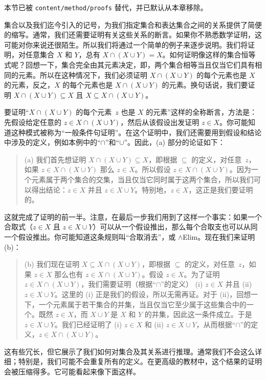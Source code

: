 \documentclass[../../../include/open-logic-section]{subfiles}
\begin{document}

\begin{editorial}
本节已被 \verb|content/method/proofs| 替代，并已默认从本章移除。
\end{editorial}

\begin{explain}
集合以及我们迄今引入的记号，为我们指定集合和表达集合之间的关系提供了简便的缩写。通常，我们还需要证明有关这些关系的断言。如果你不熟悉数学证明，这可能对你来说还很陌生。所以我们将通过一个简单的例子来逐步说明。我们将证明，对任意集合 $X$ 和 $Y$，总有 $X \cap (X \cup Y) = X$。如何证明像这样的集合恒等式呢？回想一下，集合完全由其元素决定，即，两个集合相等当且仅当它们具有相同的元素。所以在这种情况下，我们必须证明 $X \cap (X \cup Y)$ 的每个元素也是 $X$ 的元素，反之，$X$ 的每个元素也是 $X \cap (X \cup Y)$ 的元素。换句话说，我们要证明 $X \cap (X \cup Y) \subseteq X$ 且 $X \subseteq X \cap (X \cup Y)$。

要证明“$X \cap (X \cup Y)$ 的每个元素~$z$ 也是 $X$ 的元素”这样的全称断言，方法是：先假设给定任意的 $z \in X \cap (X \cup Y)$，然后从该假设出发证明 $z \in X$。你可能知道这种模式被称为“一般条件句证明”。在这个证明中，我们还需要用到假设和结论中涉及的定义，例如本例中的“$\cap$”和“$\cup$”。因此，(a) 部分的论证如下：

\begin{quote}
(a) 我们首先想证明 $X \cap (X \cup Y) \subseteq X$，即根据 $\subseteq$ 的定义，对任意~$z$，如果 $z \in X \cap (X \cup Y)$ 那么 $z \in X$。所以假设 $z \in X \cap (X \cup Y)$。因为一个元素属于两个集合的交集，当且仅当它同时属于这两个集合，所以我们可以得出结论：$z \in X$ 并且 $z \in X \cup Y$。特别地，$z \in X$，这正是我们要证明的。
\end{quote}

这就完成了证明的前一半。注意，在最后一步我们用到了这样一个事实：如果一个合取式（$z \in X$ 且 $z \in X \cup Y$）可以从一个假设推出，那么每个合取支也可以从同一个假设推出。你可能知道这条规则叫“合取消去”，或 $\land$Elim。现在我们来证明 (b)：

\begin{quote}
(b) 我们现在证明 $X \subseteq X \cap (X \cup Y)$，即根据 $\subseteq$ 的定义，对任意~$z$，如果 $z \in X$ 那么也有 $z \in X \cap (X \cup Y)$。假设 $z \in X$。为了证明 $z \in X \cap (X \cup Y)$，我们需要证明（根据“$\cap$”的定义） (i) $z \in X$ 并且 (ii) $z \in X \cup Y$。这里的 (i) 正是我们的假设，所以无需再证。对于 (ii)，回想一下，一个元素属于若干集合的并集，当且仅当它至少属于这些集合中的一个。既然 $z \in X$，而 $X \cup Y$ 是 $X$ 和 $Y$ 的并集，因此这一条件成立。于是 $z \in X \cup Y$。我们已经证明了 (i) $z \in X$ 和 (ii) $z \in X \cup Y$，从而根据“$\cap$”的定义，$z \in X \cap (X \cup Y)$。
\end{quote}

这有些冗长，但它展示了我们如何对集合及其关系进行推理。通常我们不会这么详细；特别是，我们可能不会重复所有的定义。在更高级的教材中，这个结果的证明会被压缩得多。它可能看起来像下面这样。
\end{explain}
\end{document}
